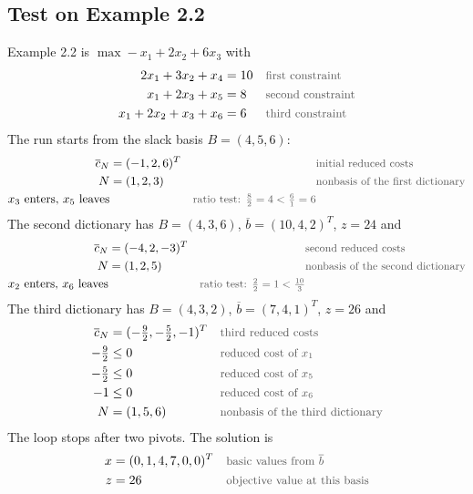 \documentclass[a4paper,11pt]{article}
\newif\ifexplain
\newcommand{\teil}[1]{\subsection*{#1}}
\newcommand{\why}[1]{\text{\small\color{black!65}#1}}
\newcommand{\explain}[1]{\ifexplain\begin{erklbox}#1\end{erklbox}\fi}
\begin{document}
\explain{Die Schleife macht pro Runde genau das, was auf Blatt 5 von Hand gerechnet wurde: Dictionary aufstellen, eintretende Variable suchen, austretende suchen, Basis tauschen. Der Abbruch steht im Auftrage: alle reduzierten Kosten nichtpositiv. Der Iterationszähler ist eine Sicherheitsnetz gegen Zyklen, die Bland's Rule aus 6.1 theoretisch ausschließt, hier aber nicht aktiviert ist.}
\teil{Test on Example 2.2}
Example 2.2 is $\max -x_1+2x_2+6x_3$ with
\begin{align*}
2x_1+3x_2+x_4&=10&&\why{first constraint}\\
x_1+2x_3+x_5&=8&&\why{second constraint}\\
x_1+2x_2+x_3+x_6&=6&&\why{third constraint}
\end{align*}
The run starts from the slack basis $B=(4,5,6)$:
\begin{align*}
\overline c_N&=(-1,2,6)^T&&\why{initial reduced costs}\\
N&=(1,2,3)&&\why{nonbasis of the first dictionary}\\
x_3\text{ enters, }x_5\text{ leaves}&&\why{ratio test: $\tfrac{8}{2}=4<\tfrac{6}{1}=6$}
\end{align*}
The second dictionary has $B=(4,3,6)$, $\overline b=(10,4,2)^T$, $z=24$ and
\begin{align*}
\overline c_N&=(-4,2,-3)^T&&\why{second reduced costs}\\
N&=(1,2,5)&&\why{nonbasis of the second dictionary}\\
x_2\text{ enters, }x_6\text{ leaves}&&\why{ratio test: $\tfrac{2}{2}=1<\tfrac{10}{3}$}
\end{align*}
The third dictionary has $B=(4,3,2)$, $\overline b=(7,4,1)^T$, $z=26$ and
\begin{align*}
\overline c_N&=(-\tfrac92,-\tfrac52,-1)^T&&\why{third reduced costs}\\
-\tfrac92&\leq 0&&\why{reduced cost of $x_1$}\\
-\tfrac52&\leq 0&&\why{reduced cost of $x_5$}\\
-1&\leq 0&&\why{reduced cost of $x_6$}\\
N&=(1,5,6)&&\why{nonbasis of the third dictionary}
\end{align*}
The loop stops after two pivots. The solution is
\begin{align*}
x&=(0,1,4,7,0,0)^T&&\why{basic values from $\overline b$}\\
z&=26&&\why{objective value at this basis}
\end{align*}
\explain{Der Testlauf bestätigt die Rechnung von Blatt 5 und Lecture 4: derselbe erste Pivot, dann ein zweiter bis zum Optimum. Zwischendrin steht das Programm einmal bei $z=24$ auf der Ecke $(0,0,4)$. Die reduzierten Kosten $-\tfrac92,-\tfrac52,-1$ sind alle negativ, also ist $z=26$ das Maximum.}
\end{document}
